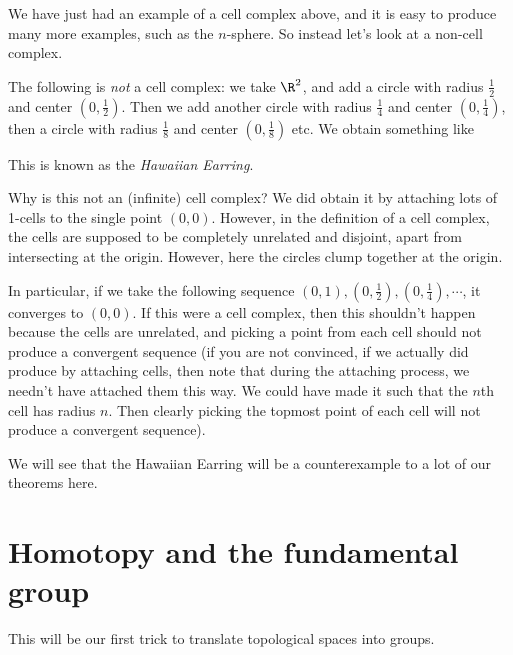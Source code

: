 \documentclass[a4paper]{article}
\begin{document}
We have just had an example of a cell complex above, and it is easy to produce many more examples, such as the $n$-sphere. So instead let's look at a non-cell complex.

\begin{eg}
  The following is \emph{not} a cell complex: we take $\R^2$, and add a circle with radius $\frac{1}{2}$ and center $(0, \frac{1}{2})$. Then we add another circle with radius $\frac{1}{4}$ and center $(0, \frac{1}{4})$, then a circle with radius $\frac{1}{8}$ and center $(0, \frac{1}{8})$ etc. We obtain something like
  \begin{center}
  \end{center}
  This is known as the \emph{Hawaiian Earring}.

  Why is this not an (infinite) cell complex? We did obtain it by attaching lots of 1-cells to the single point $(0, 0)$. However, in the definition of a cell complex, the cells are supposed to be completely unrelated and disjoint, apart from intersecting at the origin. However, here the circles clump together at the origin.

  In particular, if we take the following sequence $(0, 1), (0, \frac{1}{2}), (0, \frac{1}{4}), \cdots$, it converges to $(0, 0)$. If this were a cell complex, then this shouldn't happen because the cells are unrelated, and picking a point from each cell should not produce a convergent sequence (if you are not convinced, if we actually did produce by attaching cells, then note that during the attaching process, we needn't have attached them this way. We could have made it such that the $n$th cell has radius $n$. Then clearly picking the topmost point of each cell will not produce a convergent sequence).

  We will see that the Hawaiian Earring will be a counterexample to a lot of our theorems here.
\end{eg}

\section{Homotopy and the fundamental group}
This will be our first trick to translate topological spaces into groups.
\end{document}
